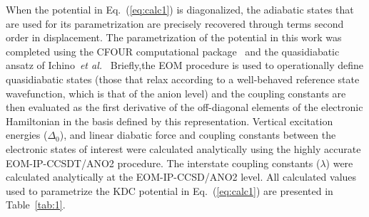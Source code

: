 \documentclass[aip,graphicx]{revtex4-1}
\begin{document}
When the potential in Eq.~(\ref{eq:calc1}) is diagonalized, the adiabatic states that are used for its parametrization are precisely recovered through terms second order in displacement. The parametrization of the potential in this work was completed using the CFOUR computational package~\cite{dev20} and the quasidiabatic ansatz of Ichino~\emph{et al.}~\cite{ich09} Briefly,the EOM procedure is used to operationally define quasidiabatic states (those that relax according to a well-behaved reference state wavefunction, which is that of the anion level) and the coupling constants are then evaluated as the first derivative of the off-diagonal elements of the electronic Hamiltonian in the basis defined by this representation. Vertical excitation energies ($\Delta_0$), and linear diabatic force and coupling constants between the electronic states of interest were calculated analytically using the highly accurate EOM-IP-CCSDT/ANO2 procedure. The interstate coupling constants ($\lambda$) were calculated analytically at the EOM-IP-CCSD/ANO2 level. All calculated values used to parametrize the KDC potential in Eq.~(\ref{eq:calc1}) are presented in Table~\ref{tab:1}.
\end{document}
